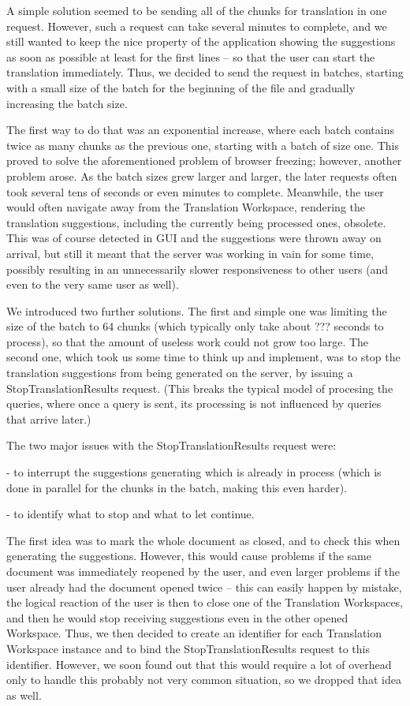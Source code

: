 A simple solution seemed to be sending all of the chunks for translation in one request. However, such a request can take several minutes to complete, and we still wanted to keep the nice property of the application showing the suggestions as soon as possible at least for the first lines -- so that the user can start the translation immediately. Thus, we decided to send the request in batches, starting with a small size of the batch for the beginning of the file and gradually increasing the batch size.

The first way to do that was an exponential increase, where each batch contains twice as many chunks as the previous one, starting with a batch of size one. This proved to solve the aforementioned problem of browser freezing; however, another problem arose. As the batch sizes grew larger and larger, the later requests often took several tens of seconds or even minutes to complete. Meanwhile, the user would often navigate away from the Translation Workspace, rendering the translation suggestions, including the currently being processed ones, obsolete. This was of course detected in GUI and the suggestions were thrown away on arrival, but still it meant that the server was working in vain for some time, possibly resulting in an unnecessarily slower responsiveness to other users (and even to the very same user as well).

We introduced two further solutions. The first and simple one was limiting the size of the batch to 64 chunks (which typically only take about ??? seconds to process), so that the amount of useless work could not grow too large. The second one, which took us some time to think up and implement, was to stop the translation suggestions from being generated on the server, by issuing a StopTranslationResults request. (This breaks the typical model of procesing the queries, where once a query is sent, its processing is not influenced by queries that arrive later.)

The two major issues with the StopTranslationResults request were:

- to interrupt the suggestions generating which is already in process (which is done in parallel for the chunks in the batch, making this even harder).

- to identify what to stop and what to let continue.

The first idea was to mark the whole document as closed, and to check this when generating the suggestions. However, this would cause problems if the same document was immediately reopened by the user, and even larger problems if the user already had the document opened twice -- this can easily happen by mistake, the logical reaction of the user is then to close one of the Translation Workspaces, and then he would stop receiving suggestions even in the other opened Workspace. Thus, we then decided to create an identifier for each Translation Workspace instance and to bind the StopTranslationResults request to this identifier. However, we soon found out that this would require a lot of overhead only to handle this probably not very common situation, so we dropped that idea as well.

